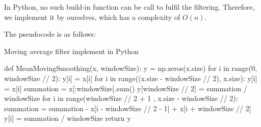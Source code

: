 \documentclass[conference]{IEEEtran}
\begin{document}
In Python, no such build-in function can be call to fulfil the filtering. Therefore, we implement it by ourselves, which has a complexity of $O(n)$.

The pseudocode is as follows:
\begin{algorithm}
	\caption{Moving average filter implement in Python}
	\begin{algorithmic}
	\STATE def MeanMovingSmoothing(x, windowSize):
    \STATE \qquad y = np.zeros(x.size)
    \STATE \qquad for i in range(0, windowSize // 2):
    \STATE \qquad \qquad y[i] = x[i]
    \STATE \qquad for i in range((x.size - windowSize // 2), x.size):
    \STATE \qquad \qquad y[i] = x[i]
    \STATE \qquad summation = x[:windowSize].sum()
    \STATE \qquad y[windowSize // 2] = summation / windowSize
    \STATE \qquad for i in range(windowSize // 2 + 1
    \STATE \qquad \qquad \qquad \qquad , x.size - windowSize // 2):
    \STATE \qquad \qquad summation = summation - 
    \STATE \qquad \qquad \qquad \qquad x[i - windowSize // 2 - 1] 
    \STATE \qquad \qquad \qquad \qquad + x[i + windowSize // 2]
    \STATE \qquad \qquad y[i] = summation / windowSize
    \STATE \qquad return y
	\end{algorithmic}
\end{algorithm}
\end{document}
